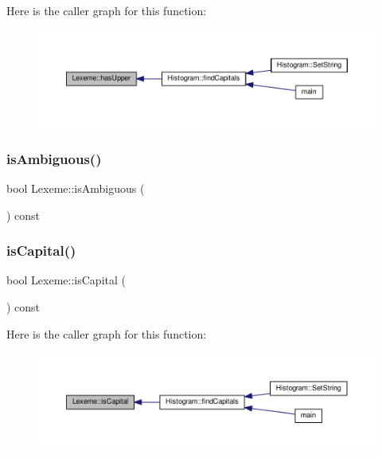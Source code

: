 Here is the caller graph for this function\+:
\nopagebreak
\begin{figure}[H]
\begin{center}
\leavevmode
\includegraphics[width=350pt]{class_lexeme_a5b40ad2f0863cbae11b0dd2c7876d8e8_icgraph}
\end{center}
\end{figure}
\mbox{\label{class_lexeme_a6319c062333968f1d47f69d7fd44900c}} 
\subsubsection{\texorpdfstring{is\+Ambiguous()}{isAmbiguous()}}
{\footnotesize\ttfamily bool Lexeme\+::is\+Ambiguous (\begin{DoxyParamCaption}{ }\end{DoxyParamCaption}) const\hspace{0.3cm}{\ttfamily [inline]}}

\mbox{\label{class_lexeme_afa5bf60e2cd601b4755cc137c56f7aed}} 
\subsubsection{\texorpdfstring{is\+Capital()}{isCapital()}}
{\footnotesize\ttfamily bool Lexeme\+::is\+Capital (\begin{DoxyParamCaption}{ }\end{DoxyParamCaption}) const\hspace{0.3cm}{\ttfamily [inline]}}

Here is the caller graph for this function\+:
\nopagebreak
\begin{figure}[H]
\begin{center}
\leavevmode
\includegraphics[width=350pt]{class_lexeme_afa5bf60e2cd601b4755cc137c56f7aed_icgraph}
\end{center}
\end{figure}
\mbox{\label{class_lexeme_a67fb5732247889cb97612dd327c7a194}} 
